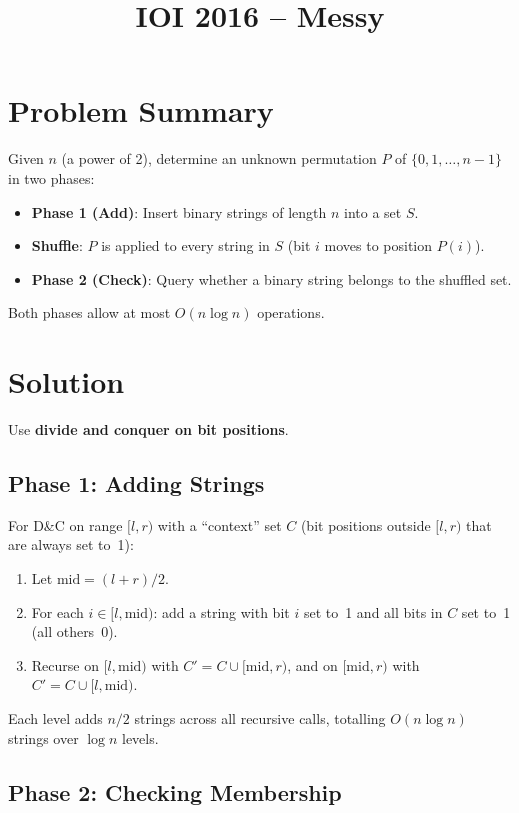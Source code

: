 \documentclass[11pt,a4paper]{article}
\title{IOI 2016 -- Messy}
\author{}
\date{}
\begin{document}
\maketitle

\section{Problem Summary}

Given $n$ (a power of 2), determine an unknown permutation $P$ of $\{0, 1, \ldots, n-1\}$ in two phases:
\begin{itemize}
  \item \textbf{Phase 1 (Add)}: Insert binary strings of length $n$ into a set $S$.
  \item \textbf{Shuffle}: $P$ is applied to every string in $S$ (bit $i$ moves to position $P(i)$).
  \item \textbf{Phase 2 (Check)}: Query whether a binary string belongs to the shuffled set.
\end{itemize}
Both phases allow at most $O(n \log n)$ operations.

\section{Solution}

Use \textbf{divide and conquer on bit positions}.

\subsection{Phase 1: Adding Strings}

For D\&C on range $[l, r)$ with a ``context'' set $C$ (bit positions outside $[l, r)$ that are always set to~1):
\begin{enumerate}
  \item Let $\text{mid} = (l + r) / 2$.
  \item For each $i \in [l, \text{mid})$: add a string with bit $i$ set to~1 and all bits in $C$ set to~1 (all others~0).
  \item Recurse on $[l, \text{mid})$ with $C' = C \cup [\text{mid}, r)$, and on $[\text{mid}, r)$ with $C' = C \cup [l, \text{mid})$.
\end{enumerate}

Each level adds $n/2$ strings across all recursive calls, totalling $O(n \log n)$ strings over $\log n$ levels.

\subsection{Phase 2: Checking Membership}
\end{document}
